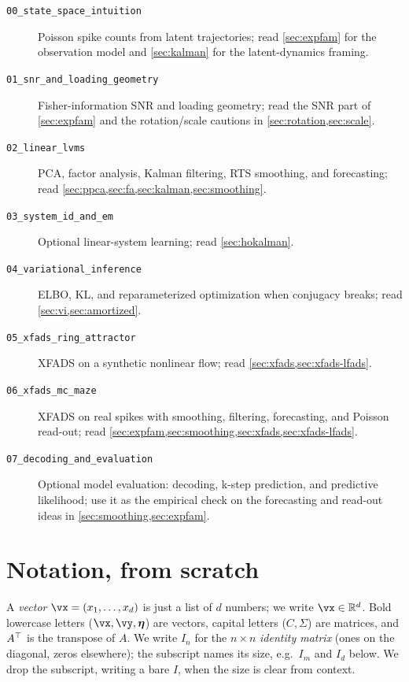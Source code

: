 \documentclass[11pt]{article}
\theoremstyle{plain}
\theoremstyle{definition}
\theoremstyle{remark}
\theoremstyle{definition}
\newcommand{\veta}{\bm{\eta}}
\begin{document}
\begin{description}
    \item[\texttt{00\_state\_space\_intuition}] Poisson spike counts from latent
        trajectories; read \cref{sec:expfam} for the observation model and
        \cref{sec:kalman} for the latent-dynamics framing.
    \item[\texttt{01\_snr\_and\_loading\_geometry}] Fisher-information SNR and
        loading geometry; read the SNR part of \cref{sec:expfam} and the
        rotation/scale cautions in \cref{sec:rotation,sec:scale}.
    \item[\texttt{02\_linear\_lvms}] PCA, factor analysis, Kalman filtering, RTS
        smoothing, and forecasting; read
        \cref{sec:ppca,sec:fa,sec:kalman,sec:smoothing}.
    \item[\texttt{03\_system\_id\_and\_em}] Optional linear-system learning; read
        \cref{sec:hokalman}.
    \item[\texttt{04\_variational\_inference}] ELBO, KL, and reparameterized
        optimization when conjugacy breaks; read \cref{sec:vi,sec:amortized}.
    \item[\texttt{05\_xfads\_ring\_attractor}] XFADS on a synthetic nonlinear
        flow; read \cref{sec:xfads,sec:xfads-lfads}.
    \item[\texttt{06\_xfads\_mc\_maze}] XFADS on real spikes with smoothing,
        filtering, forecasting, and Poisson read-out; read
        \cref{sec:expfam,sec:smoothing,sec:xfads,sec:xfads-lfads}.
    \item[\texttt{07\_decoding\_and\_evaluation}] Optional model evaluation:
        decoding, k-step prediction, and predictive likelihood; use it as the
        empirical check on the forecasting and read-out ideas in
        \cref{sec:smoothing,sec:expfam}.
\end{description}

\section{Notation, from scratch}\label{sec:notation}

A \emph{vector} $\vx = (x_1, \dots, x_d)$ is just a list of $d$ numbers; we write
$\vx \in \reals^d$. Bold lowercase letters ($\vx, \vy, \veta$) are vectors,
capital letters ($C, \Sigma$) are matrices, and $A{^\top}$ is the transpose of $A$.
We write $I_n$ for the $n \times n$ \emph{identity matrix} (ones on the diagonal,
zeros elsewhere); the subscript names its size, e.g.\ $I_m$ and $I_d$ below. We
drop the subscript, writing a bare $I$, when the size is clear from context.
\end{document}
